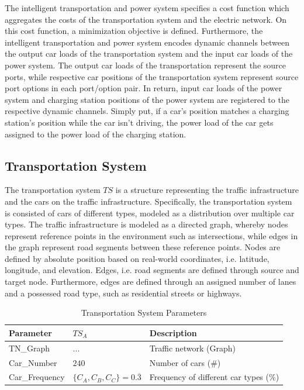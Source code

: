 The intelligent transportation and power system specifies a cost function which aggregates the costs of the transportation system and the electric network. On this cost function, a minimization objective is defined. Furthermore, the intelligent transportation and power system encodes dynamic channels between the output car loads of the transportation system and the input car loads of the power system. The output car loads of the transportation represent the source ports, while respective car positions of the transportation system represent source port options in each port/option pair. In return, input car loads of the power system and charging station positions of the power system are registered to the respective dynamic channels. Simply put, if a car's position matches a charging station's position while the car isn't driving, the power load of the car gets assigned to the power load of the charging station.

\subsection{Transportation System}

The transportation system $TS$ is a structure representing the traffic infrastructure and the cars on the traffic infrastructure. Specifically, the transportation system is consisted of cars of different types, modeled as a distribution over multiple car types. The traffic infrastructure is modeled as a directed graph, whereby nodes represent reference points in the environment such as intersections, while edges in the graph represent road segments between these reference points. Nodes are defined by absolute position based on real-world coordinates, i.e. latitude, longitude, and elevation. Edges, i.e. road segments are defined through source and target node. Furthermore, edges are defined through an assigned number of lanes and a possessed road type, such as residential streets or highways.

\begin{table}[h]
	\renewcommand{\arraystretch}{1.3}
	\caption{Transportation System Parameters}
	\centering
	\begin{tabular}{lll}
		\hline
		\textbf{Parameter}     & \textbf{$TS_{A}$}         & \textbf{Description} \\ \hline
		TN\_Graph              & $...$    & Traffic network (Graph)    \\
		Car\_Number            & $240$    & Number of cars (\#)      \\ 
		Car\_Frequency      & $\{C_{A},C_{B},C_{C}\} = 0.\overline{3}$    & Frequency of different car types (\%)       \\ \hline
	\end{tabular}
\end{table}


